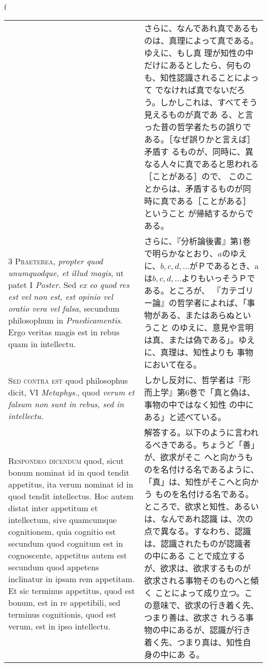 \\f\documentclass[10pt]{jsarticle} %
\begin{document}
\begin{longtable}{p{21em}p{21em}}
&

さらに、なんであれ真であるものは、真理によって真である。ゆえに、もし真
 理が知性の中だけにあるとしたら、何ものも、知性認識されることによって
 でなければ真でないだろう。しかしこれは、すべてそう見えるものが真であ
 る、と言った昔の哲学者たちの誤りである。［なぜ誤りかと言えば］矛盾す
 るものが、同時に、異なる人々に真であると思われる［ことがある］ので、
 このことからは、矛盾するものが同時に真である［ことがある］ということ
 が帰結するからである。

\\


{\scshape 3 Praeterea}, {\itshape propter quod unumquodque, et illud
magis}, ut patet I {\itshape Poster}. Sed {\itshape ex eo quod res est
vel non est, est opinio vel oratio vera vel falsa}, secundum
philosophum in {\itshape Praedicamentis}. Ergo veritas magis est in
rebus quam in intellectu.


&

さらに、『分析論後書』第1巻で明らかなとおり、$a$のゆえに、$b, c, d,
...$がＰであるとき、aは$b, c, d, ...$よりもいっそうＰである。ところが、
『カテゴリー論』の哲学者によれば、「事物がある、またはあらぬということ
のゆえに、意見や言明は真、または偽である」。ゆえに、真理は、知性よりも
事物において在る。

\\


{\scshape Sed contra est} quod philosophus dicit, VI {\itshape
Metaphys}., quod {\itshape verum et falsum non sunt in rebus, sed in
intellectu}.


&

 しかし反対に、哲学者は『形而上学』第6巻で「真と偽は、事物の中ではなく知性
 の中にある」と述べている。


\\


{\scshape Respondeo dicendum} quod, sicut bonum nominat id in quod
tendit appetitus, ita verum nominat id in quod tendit intellectus. Hoc
autem distat inter appetitum et intellectum, sive quamcumque
cognitionem, quia cognitio est secundum quod cognitum est in
cognoscente, appetitus autem est secundum quod appetens inclinatur in
ipsam rem appetitam. Et sic terminus appetitus, quod est bonum, est in
re appetibili, sed terminus cognitionis, quod est verum, est in ipso
intellectu.


&

解答する。以下のように言われるべきである。ちょうど「善」が、欲求がそこ
へと向かうものを名付ける名であるように、「真」は、知性がそこへと向かう
ものを名付ける名である。ところで、欲求と知性、あるいは、なんであれ認識
は、次の点で異なる。すなわち、認識は、認識されたものが認識者の中にある
ことで成立するが、欲求は、欲求するものが欲求される事物そのものへと傾く
ことによって成り立つ。この意味で、欲求の行き着く先、つまり善は、欲求さ
れうる事物の中にあるが、認識が行き着く先、つまり真は、知性自身の中にあ
る。


\end{longtable}
\end{document}
